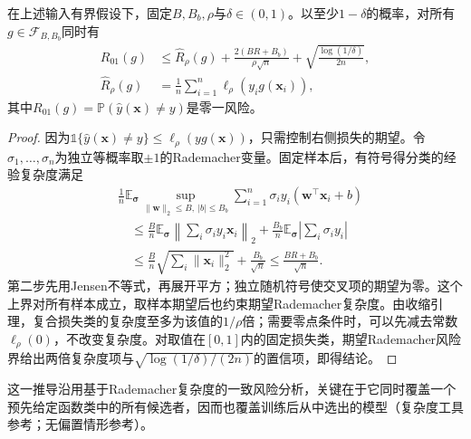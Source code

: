 \begin{theorem}[含偏置的间隔风险界]
  \label{thm:classification-svm-margin-bound}
  在上述输入有界假设下，固定$B,B_b,\rho$与$\delta\in(0,1)$。以至少$1-\delta$的概率，对所有$g\in\mathcal{F}_{B,B_b}$同时有
  \begin{equation}
    \begin{aligned}
      R_{01}(g)
      &\le \widehat R_\rho(g)
       +\frac{2(BR+B_b)}{\rho\sqrt n}
       +\sqrt{\frac{\log(1/\delta)}{2n}},\\
      \widehat R_\rho(g)
      &=\frac1n\sum_{i=1}^n\ell_\rho(y_i g(\bm{x}_i)),
    \end{aligned}
    \label{eq:classification-svm-margin-bound}
  \end{equation}
  其中$R_{01}(g)=\mathbb{P}(\hat y(\bm{x})\ne y)$是零一风险。
\end{theorem}
\begin{proof}
因为$\mathbb{1}\{\hat y(\bm{x})\ne y\}\le\ell_\rho(y g(\bm{x}))$，只需控制右侧损失的期望。令$\sigma_1,\ldots,\sigma_n$为独立等概率取$\pm1$的Rademacher变量。固定样本后，有符号得分类的经验复杂度满足
\[
  \begin{aligned}
    &\frac1n\mathbb{E}_{\bm{\sigma}}
      \sup_{\lVert\bm{w}\rVert_2\le B,\ |b|\le B_b}
      \sum_{i=1}^n\sigma_i y_i
       (\bm{w}^{\top}\bm{x}_i+b)\\
    &\quad\le
      \frac{B}{n}\mathbb{E}_{\bm{\sigma}}
        \left\lVert\sum_i\sigma_i y_i\bm{x}_i\right\rVert_2
      +\frac{B_b}{n}\mathbb{E}_{\bm{\sigma}}
        \left|\sum_i\sigma_i y_i\right|\\
    &\quad\le
      \frac{B}{n}\sqrt{\sum_i\lVert\bm{x}_i\rVert_2^2}
      +\frac{B_b}{\sqrt n}
      \le\frac{BR+B_b}{\sqrt n}.
  \end{aligned}
\]
第二步先用Jensen不等式，再展开平方；独立随机符号使交叉项的期望为零。这个上界对所有样本成立，取样本期望后也约束期望Rademacher复杂度。由收缩引理，复合损失类的复杂度至多为该值的$1/\rho$倍；需要零点条件时，可以先减去常数$\ell_\rho(0)$，不改变复杂度。对取值在$[0,1]$内的固定损失类，期望Rademacher风险界给出两倍复杂度项与$\sqrt{\log(1/\delta)/(2n)}$的置信项，即得结论。
\end{proof}

这一推导沿用基于Rademacher复杂度的一致风险分析，关键在于它同时覆盖一个预先给定函数类中的所有候选者，因而也覆盖训练后从中选出的模型（复杂度工具参考；无偏置情形参考）。

